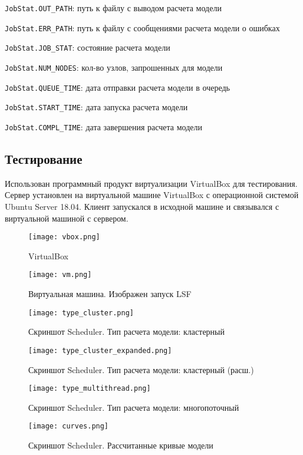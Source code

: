 \lstinline{JobStat.OUT_PATH}: путь к файлу с выводом расчета модели

\lstinline{JobStat.ERR_PATH}: путь к файлу с сообщениями расчета модели о ошибках

\lstinline{JobStat.JOB_STAT}: состояние расчета модели

\lstinline{JobStat.NUM_NODES}: кол-во узлов, запрошенных для модели

\lstinline{JobStat.QUEUE_TIME}: дата отправки расчета модели в очередь

\lstinline{JobStat.START_TIME}: дата запуска расчета модели

\lstinline{JobStat.COMPL_TIME}: дата завершения расчета модели

\subsection{Тестирование}

Использован программный продукт виртуализации VirtualBox для тестирования. Сервер установлен на виртуальной машине VirtualBox с операционной системой Ubuntu Server 18.04. Клиент запускался в исходной машине и связывался с виртуальной машиной с сервером.

\begin{figure}[h]
    \centering
    \texttt{[image: vbox.png]}
    \caption{VirtualBox}
\end{figure}

\begin{figure}[h]
    \centering
    \texttt{[image: vm.png]}
    \caption{Виртуальная машина. Изображен запуск LSF}
\end{figure}

\begin{figure}[h]
    \centering
    \texttt{[image: type\_cluster.png]}
    \caption{Скриншот Scheduler. Тип расчета модели: кластерный}
\end{figure}

\begin{figure}[h]
    \centering
    \texttt{[image: type\_cluster\_expanded.png]}
    \caption{Скриншот Scheduler. Тип расчета модели: кластерный (расш.)}
\end{figure}

\begin{figure}[h]
    \centering
    \texttt{[image: type\_multithread.png]}
    \caption{Скриншот Scheduler. Тип расчета модели: многопоточный}
\end{figure}

\begin{figure}[h]
    \centering
    \texttt{[image: curves.png]}
    \caption{Скриншот Scheduler. Рассчитанные кривые модели}
\end{figure}

\clearpage